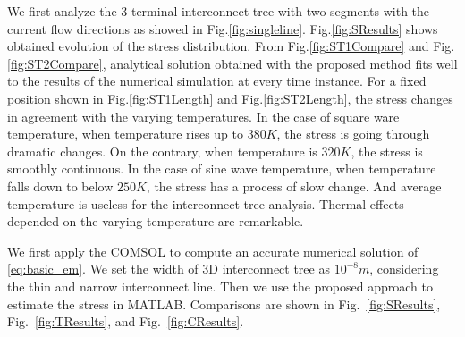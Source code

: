 We first analyze the 3-terminal interconnect tree with two segments with the current flow directions as showed in Fig.\ref{fig:singleline}. Fig.\ref{fig:SResults} shows obtained evolution of the stress distribution. From Fig.\ref{fig:ST1Compare} and Fig.\ref{fig:ST2Compare}, analytical solution obtained with the proposed method fits well to the results of the numerical simulation at every time instance. For a fixed position shown in Fig.\ref{fig:ST1Length} and Fig.\ref{fig:ST2Length}, the stress changes in agreement with the varying temperatures. In the case of square ware temperature, when temperature rises up to $380K$, the stress is going through dramatic changes. On the contrary, when temperature is $320K$, the stress is smoothly continuous. In the case of sine wave temperature, when temperature falls down to below $250K$, the stress has a process of slow change. And average temperature is useless for the interconnect tree analysis. Thermal effects depended on the varying temperature are remarkable.

We first apply the COMSOL to compute an accurate numerical solution of \eqref{eq:basic_em}. We set the width of 3D interconnect tree as $10^{-8}m$, considering the thin and narrow interconnect line. Then we use the proposed approach to estimate the stress in MATLAB. Comparisons are shown in Fig.~\ref{fig:SResults}, Fig.~\ref{fig:TResults}, and Fig.~\ref{fig:CResults}.




